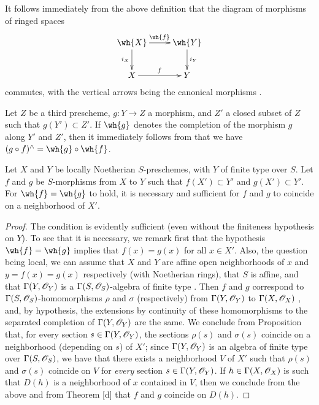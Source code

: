 \begin{env}[10.9.2]
\label{1.10.9.2}
It follows immediately from the above definition that the diagram of morphisms of ringed spaces
\[
  \xymatrix{
    \wh{X}\ar[r]^{\wh{f}}\ar[d]_{i_X} &
    \wh{Y}\ar[d]^{i_Y}\\
    X\ar[r]^f &
    Y
  }
\]
commutes, with the vertical arrows being the canonical morphisms .
\end{env}

\begin{env}[10.9.3]
\label{1.10.9.3}
Let $Z$ be a third prescheme, $g:Y\to Z$ a morphism, and $Z'$ a closed subset of $Z$ such that $g(Y')\subset Z'$.
If $\wh{g}$ denotes the completion of the morphism $g$ along $Y'$ and $Z'$, then it immediately follows from  that we have $(g\circ f)^\wedge=\wh{g}\circ\wh{f}$.
\end{env}

\begin{proposition}[10.9.4]
\label{1.10.9.4}
Let $X$ and $Y$ be locally Noetherian $S$-preschemes, with $Y$ of finite type over $S$.
Let $f$ and $g$ be $S$-morphisms from $X$ to $Y$ such that $f(X')\subset Y'$ and $g(X')\subset Y'$.
For $\wh{f}=\wh{g}$ to hold, it is necessary and sufficient for $f$ and $g$ to coincide on a neighborhood of $X'$.
\end{proposition}

\begin{proof}
\label{proof-1.10.9.4}
The condition is evidently sufficient (even without the finiteness hypothesis on $Y$).
To see that it is necessary, we remark first that the hypothesis $\wh{f}=\wh{g}$ implies that $f(x)=g(x)$ for all $x\in X'$.
Also, the question being local, we can assume that $X$ and $Y$ are affine open neighborhoods of $x$ and $y=f(x)=g(x)$ respectively (with Noetherian rings), that $S$ is affine, and that $\Gamma(Y,\mathscr{O}_Y)$ is a $\Gamma(S,\mathscr{O}_S)$-algebra of finite type .
Then $f$ and $g$ correspond to $\Gamma(S,\mathscr{O}_S)$-homomorphisms $\rho$ and $\sigma$ (respectively) from $\Gamma(Y,\mathscr{O}_Y)$ to $\Gamma(X,\mathscr{O}_X)$ , and, by hypothesis, the extensions by continuity of these homomorphisms to the separated completion of $\Gamma(Y,\mathscr{O}_Y)$ are the same.
We conclude from Proposition  that, for every section $s\in\Gamma(Y,\mathscr{O}_Y)$, the sections $\rho(s)$ and $\sigma(s)$ coincide on a neighborhood (depending on $s$) of $X'$; since $\Gamma(Y,\mathscr{O}_Y)$ is an algebra of finite type over $\Gamma(S,\mathscr{O}_S)$, we have that there exists a neighborhood $V$ of $X'$ such that $\rho(s)$ and $\sigma(s)$ coincide on $V$ for \emph{every} section $s\in\Gamma(Y,\mathscr{O}_Y)$.
If $h\in\Gamma(X,\mathscr{O}_X)$ is such that $D(h)$ is a neighborhood of $x$ contained in $V$, then we conclude from the above and from Theorem [d] that $f$ and $g$ coincide on $D(h)$.
\end{proof}

